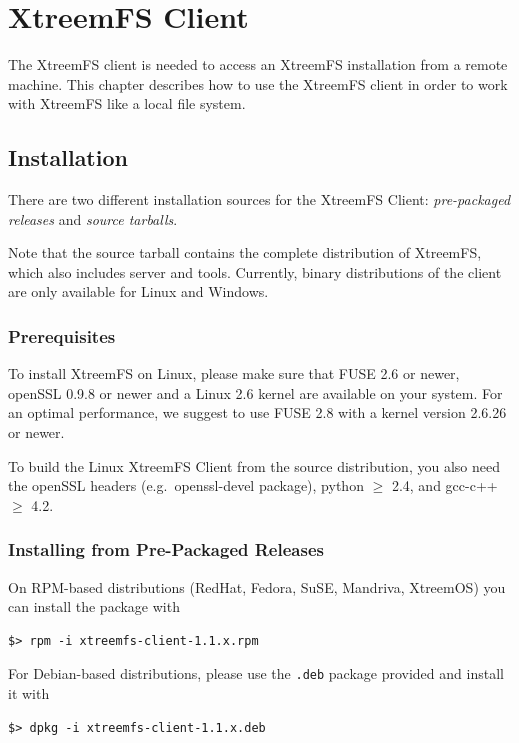 \documentclass[a4paper,10pt]{book}
\begin{document}
\chapter{XtreemFS Client}

The XtreemFS client is needed to access an XtreemFS installation from a remote machine. This chapter describes how to use the XtreemFS client in order to work with XtreemFS like a local file system.

\section{Installation}

There are two different installation sources for the XtreemFS Client: \emph{pre-packaged releases} and \emph{source tarballs}.

Note that the source tarball contains the complete distribution of XtreemFS, which also includes server and tools. Currently, binary distributions of the client are only available for Linux and Windows.

\subsection{Prerequisites}

To install XtreemFS on Linux, please make sure that FUSE 2.6 or newer, openSSL 0.9.8 or newer and a Linux 2.6 kernel are available on your system. For an optimal performance, we suggest to use FUSE 2.8 with a kernel version 2.6.26 or newer.

To build the Linux XtreemFS Client from the source distribution, you also need the openSSL headers (e.g.\ openssl-devel package), python $\geq$ 2.4, and gcc-c++ $\geq$ 4.2.

\subsection{Installing from Pre-Packaged Releases}

On RPM-based distributions (RedHat, Fedora, SuSE, Mandriva, XtreemOS) you can install the package with

\begin{verbatim}
$> rpm -i xtreemfs-client-1.1.x.rpm
\end{verbatim}


For Debian-based distributions, please use the \texttt{.deb} package provided and install it with

\begin{verbatim}
$> dpkg -i xtreemfs-client-1.1.x.deb
\end{verbatim}
\end{document}
